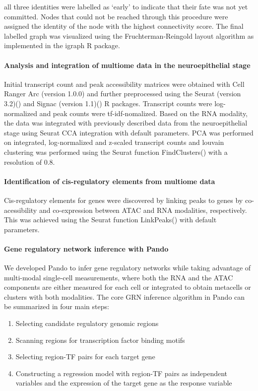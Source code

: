 all three identities were labelled as ‘early' to indicate that their fate was not yet committed. Nodes that could not be reached through this procedure were assigned the identity of the node with the highest connectivity score. The final labelled graph was visualized using the Fruchterman-Reingold layout algorithm as implemented in the igraph R package.
 
\paragraph{Analysis and integration of multiome data in the neuroepithelial stage}
Initial transcript count and peak accessibility matrices were obtained with Cell Ranger Arc (version 1.0.0) and further preprocessed using the Seurat (version 3.2)(\cite{stuart_comprehensive_2019}) and Signac (version 1.1)(\cite{stuart_multimodal_2020}) R packages. Transcript counts were log-normalized and peak counts were tf-idf-nomalized. Based on the RNA modality, the data was integrated with previously described data from the neuroepithelial stage using Seurat CCA integration with default parameters. PCA was performed on integrated, log-normalized and z-scaled transcript counts and louvain clustering was performed using the Seurat function FindClusters() with a resolution of 0.8.
 
\paragraph{Identification of cis-regulatory elements from multiome data}
Cis-regulatory elements for genes were discovered by linking peaks to genes by co-acessibility and co-expression between ATAC and RNA modalities, respectively. This was achieved using the Seurat function LinkPeaks() with default parameters.
 
\paragraph{Gene regulatory network inference with Pando}
We developed Pando to infer gene regulatory networks while taking advantage of multi-modal single-cell measurements, where both the RNA and the ATAC components are either measured for each cell or integrated to obtain metacells or clusters with both modalities. The core GRN inference algorithm in Pando can be summarized in four main steps:

\begin{enumerate}
\item Selecting candidate regulatory genomic regions \
\item Scanning regions for transcription factor binding motifs \
\item Selecting region-TF pairs for each target gene \
\item Constructing a regression model with region-TF pairs as independent variables and the expression of the target gene as the response variable
\end{enumerate} 

